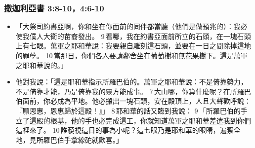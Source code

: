 \subsubsection{撒迦利亞書 3:8-10，4:6-10}
\begin{itemize} 
\itemsep-.25em
\item 「大祭司約書亞啊，你和坐在你面前的同伴都當聽（他們是做預兆的）：我必使我僕人大衛的苗裔發出。 9 看哪，我在約書亞面前所立的石頭，在一塊石頭上有七眼。萬軍之耶和華說：我要親自雕刻這石頭，並要在一日之間除掉這地的罪孽。 10 當那日，你們各人要請鄰舍坐在葡萄樹和無花果樹下。這是萬軍之耶和華說的。」
\item 他對我說：「這是耶和華指示所羅巴伯的。萬軍之耶和華說：不是倚靠勢力，不是倚靠才能，乃是倚靠我的靈方能成事。 7 大山哪，你算什麼呢？在所羅巴伯面前，你必成為平地。他必搬出一塊石頭，安在殿頂上，人且大聲歡呼說：『願恩惠，恩惠歸於這殿！』」 8 耶和華的話又臨到我說： 9 「所羅巴伯的手立了這殿的根基，他的手也必完成這工，你就知道萬軍之耶和華差遣我到你們這裡來了。 10 誰藐視這日的事為小呢？這七眼乃是耶和華的眼睛，遍察全地，見所羅巴伯手拿線砣就歡喜。」
\end{itemize} 


